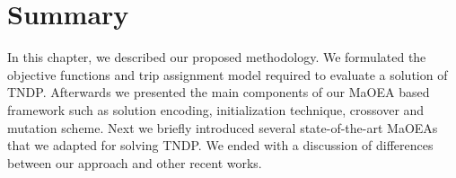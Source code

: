 \section{Summary}
In this chapter, we described our proposed methodology. We formulated the objective functions and trip assignment model required to evaluate a solution of TNDP. Afterwards we presented the main components of our MaOEA based framework such as solution encoding, initialization technique, crossover and mutation scheme. Next we briefly introduced several state-of-the-art MaOEAs that we adapted for solving TNDP. We ended with a discussion of differences between our approach and other recent works.
